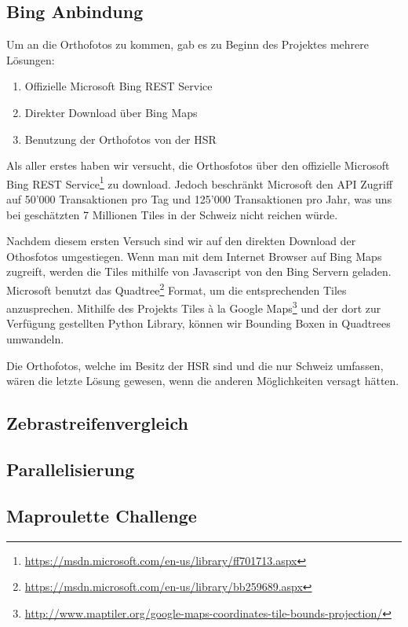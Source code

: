 \subsection{Bing Anbindung}
Um an die Orthofotos zu kommen, gab es zu Beginn des Projektes mehrere Lösungen:
\begin{enumerate}
	\item Offizielle Microsoft Bing REST Service
	\item Direkter Download über Bing Maps
	\item Benutzung der Orthofotos von der HSR
\end{enumerate}

Als aller erstes haben wir versucht, die Orthosfotos über den offizielle Microsoft Bing REST Service\footnote{\url{https://msdn.microsoft.com/en-us/library/ff701713.aspx}} zu download. Jedoch beschränkt Microsoft den API Zugriff auf 50'000 Transaktionen pro Tag und 125'000 Transaktionen pro Jahr, was uns bei geschätzten 7 Millionen Tiles in der Schweiz nicht reichen würde.

Nachdem diesem ersten Versuch sind wir auf den direkten Download der Othosfotos umgestiegen. Wenn man mit dem Internet Browser auf Bing Maps zugreift, werden die Tiles mithilfe von Javascript von den Bing Servern geladen. Microsoft benutzt das Quadtree\footnote{\url{https://msdn.microsoft.com/en-us/library/bb259689.aspx}} Format, um die entsprechenden Tiles anzusprechen. Mithilfe des Projekts Tiles à la Google Maps\footnote{\url{http://www.maptiler.org/google-maps-coordinates-tile-bounds-projection/}} und der dort zur Verfügung gestellten Python Library, können wir Bounding Boxen in Quadtrees umwandeln.

Die Orthofotos, welche im Besitz der HSR sind und die nur Schweiz umfassen, wären die letzte Lösung gewesen, wenn die anderen Möglichkeiten versagt hätten.

\subsection{Zebrastreifenvergleich}
\subsection{Parallelisierung}
\subsection{Maproulette Challenge}
